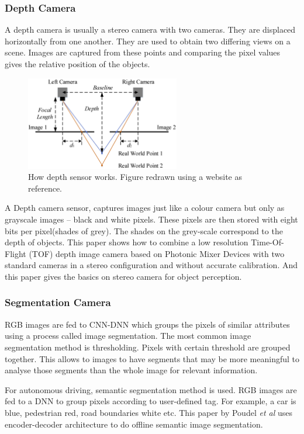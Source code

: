 \subsubsection*{Depth Camera}
A depth camera is usually a stereo camera with two cameras. They are displaced
horizontally from one another. They are used to obtain two differing views on a scene.
Images are captured from these points and comparing the pixel values gives the relative position of
the objects.
\begin{figure}[!ht]
	\centering
    \includegraphics[width=0.6\textwidth,
    scale=0.1]{figures/inkscape/depthsensor2.png}
    \caption{How depth sensor works. Figure redrawn using a website
    \cite{depthstereodiagramsource} as reference.}
    \label{fig:depthcamera}
\end{figure}
A Depth camera sensor, captures images just like
a colour camera but only as grayscale images -- black and white pixels. These pixels are
then stored with eight bits per pixel(shades of grey). The shades on the grey-scale correspond to the depth of objects.
This paper \cite{depthsensorpaper1} shows how to combine  a  low  resolution
Time-Of-Flight  (TOF)  depth  image  camera based on Photonic Mixer Devices with two
standard cameras in a stereo configuration and without accurate calibration. And this
paper \cite{depthsensorpaper2} gives the basics on stereo camera for object perception.
\subsubsection*{Segmentation Camera}
RGB images are fed to CNN-DNN which groups the pixels of similar attributes using a
process called image segmentation. The most common image segmentation method is
thresholding. Pixels with certain threshold are grouped together. This allows to images to
have segments that may be more meaningful to analyse those segments than the whole image
for relevant information.

For autonomous driving, semantic segmentation method is used. RGB images are fed to a DNN
to group pixels according to user-defined tag. For example, a car is blue, pedestrian red, road boundaries white etc.
This paper by Poudel \textit{et al} \cite{segmentationpaper} uses encoder-decoder
architecture to do offline semantic image segmentation.


